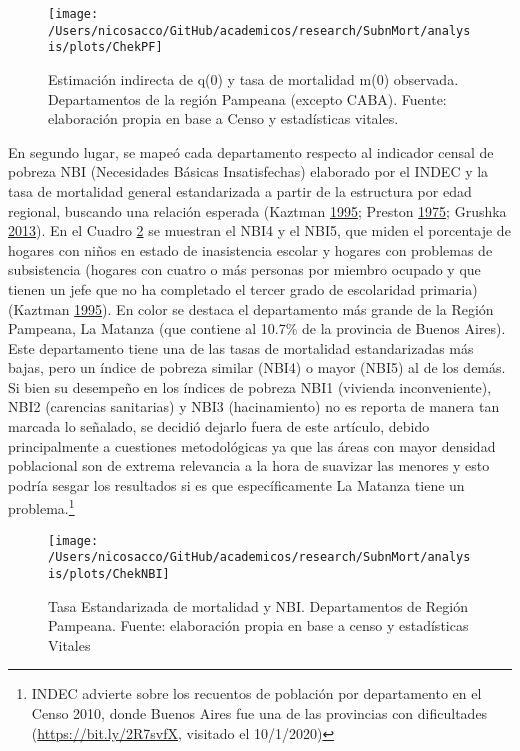 \documentclass[12pt,spanish,]{article}
\begin{document}
\begin{figure}

{\centering \texttt{[image: /Users/nicosacco/GitHub/academicos/research/SubnMort/analysis/plots/ChekPF]} 

}

\caption{Estimación indirecta de q(0) y tasa de mortalidad m(0) observada. Departamentos de la región Pampeana (excepto CABA). Fuente: elaboración propia en base a Censo y estadísticas vitales.}\label{fig:PF}
\end{figure}

En segundo lugar, se mapeó cada departamento respecto al indicador
censal de pobreza NBI (Necesidades Básicas Insatisfechas) elaborado por
el INDEC y la tasa de mortalidad general estandarizada a partir de la
estructura por edad regional, buscando una relación esperada (Kaztman
\protect\hyperlink{ref-Kaztman1995}{1995}; Preston
\protect\hyperlink{ref-Preston1975}{1975}; Grushka
\protect\hyperlink{ref-Grushka2013}{2013}). En el Cuadro \ref{fig:NBI}
se muestran el NBI4 y el NBI5, que miden el porcentaje de hogares con
niños en estado de inasistencia escolar y hogares con problemas de
subsistencia (hogares con cuatro o más personas por miembro ocupado y
que tienen un jefe que no ha completado el tercer grado de escolaridad
primaria) (Kaztman \protect\hyperlink{ref-Kaztman1995}{1995}). En color
se destaca el departamento más grande de la Región Pampeana, La Matanza
(que contiene al 10.7\% de la provincia de Buenos Aires). Este
departamento tiene una de las tasas de mortalidad estandarizadas más
bajas, pero un índice de pobreza similar (NBI4) o mayor (NBI5) al de los
demás. Si bien su desempeño en los índices de pobreza NBI1 (vivienda
inconveniente), NBI2 (carencias sanitarias) y NBI3 (hacinamiento) no es
reporta de manera tan marcada lo señalado, se decidió dejarlo fuera de
este artículo, debido principalmente a cuestiones metodológicas ya que
las áreas con mayor densidad poblacional son de extrema relevancia a la
hora de suavizar las menores y esto podría sesgar los resultados si es
que específicamente La Matanza tiene un problema.\footnote{INDEC
  advierte sobre los recuentos de población por departamento en el Censo
  2010, donde Buenos Aires fue una de las provincias con dificultades
  (\url{https://bit.ly/2R7svfX}, visitado el 10/1/2020)}

\begin{figure}

{\centering \texttt{[image: /Users/nicosacco/GitHub/academicos/research/SubnMort/analysis/plots/ChekNBI]} 

}

\caption{Tasa Estandarizada de mortalidad y NBI. Departamentos de Región Pampeana. Fuente: elaboración propia en base a censo y estadísticas Vitales}\label{fig:NBI}
\end{figure}
\end{document}
